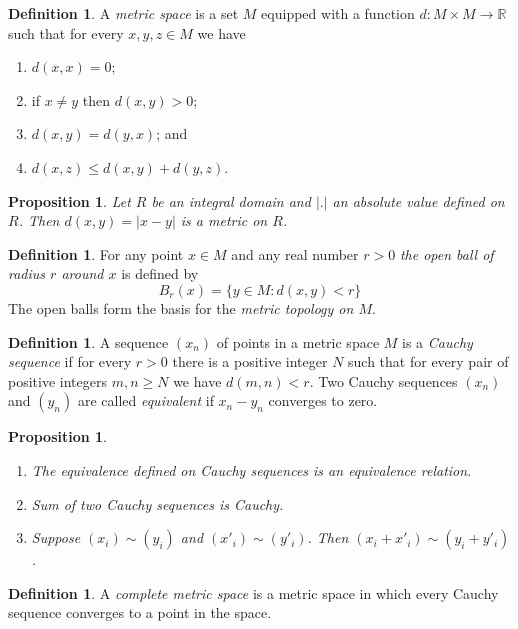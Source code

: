 \documentclass[12pt]{article}
\newtheorem{prop}[thm]{Proposition}
\theoremstyle{definition}
\newtheorem{dfn}[thm]{Definition}
\theoremstyle{remark}
\begin{document}
    \begin{dfn}
        A \emph{metric space} is a set $M$ equipped with a function $d\colon M\times M\to \mathbb{R}$ such that for every $x,y,z\in M$ we have
        \begin{enumerate}[label=(\alph*)]
            \item $d(x,x)=0$;
            \item if $x\neq y$ then $d(x,y)>0$;
            \item $d(x,y) = d(y,x)$; and
            \item $d(x,z)\leq d(x,y)+d(y,z)$.
        \end{enumerate}
    \end{dfn}

    \begin{prop}
        Let $R$ be an integral domain and $|.|$ an absolute value defined on $R$. Then $d(x,y)=|x-y|$ is a metric on $R$.
    \end{prop}

    \begin{dfn}
        For any point $x\in M$ and any real number $r>0$ \emph{the open ball of radius $r$ around $x$} is defined by
        $$B_r(x)=\{y\in M : d(x,y) < r\}$$
        The open balls form the basis for the \emph{metric topology on $M$}.
    \end{dfn}

    \begin{dfn}
        A sequence $(x_n)$ of points in a metric space $M$ is a \emph{Cauchy sequence} if for every $r>0$ there is a positive integer $N$ such that for every pair of positive integers $m,n\geq N$ we have $d(m,n)<r$. Two Cauchy sequences $(x_n)$ and $(y_n)$ are called \emph{equivalent} if $x_n-y_n$ converges to zero.
    \end{dfn}

    \begin{prop}
        \begin{enumerate}[label=(\alph*)]
            \item The equivalence defined on Cauchy sequences is an equivalence relation.
            \item Sum of two Cauchy sequences is Cauchy.
            \item Suppose $(x_i)\sim(y_i)$ and $(x'_i)\sim(y'_i)$. Then $(x_i+x'_i)\sim(y_i+y'_i)$.
        \end{enumerate}
    \end{prop}

    \begin{dfn}
        A \emph{complete metric space} is a metric space in which every Cauchy sequence converges to a point in the space.
    \end{dfn}
\end{document}
